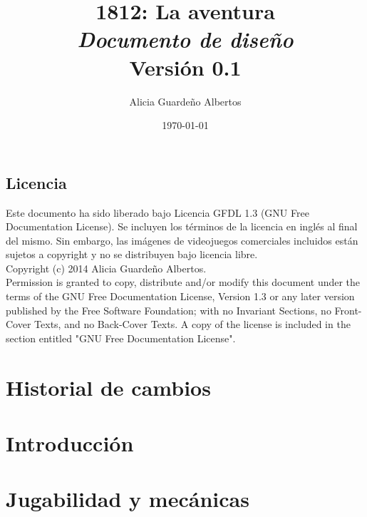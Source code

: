 \documentclass[a4paper,11pt,titlepage]{book}
\title{{\Huge \bf 1812: La aventura}\\{\large \em Documento de diseño}\\{\normalsize Versión 0.1}}
\author{Alicia Guardeño Albertos}
\date{\today}
\begin{document}
\renewcommand{\figurename}{Figura}
\renewcommand{\listfigurename}{Indice de figuras}
\renewcommand{\tablename}{Tabla}
\renewcommand{\listtablename}{Indice de tablas}

\vfill
\maketitle
\vfill
    \tableofcontents
    \listoffigures

\setlength{\parskip}{\baselineskip} %

\newpage
\section*{Licencia} %

Este documento ha sido liberado bajo Licencia GFDL 1.3 (GNU Free
Documentation License). Se incluyen los términos de la licencia en
inglés al final del mismo. Sin embargo, las imágenes de videojuegos comerciales incluidos están sujetos a copyright y no se distribuyen bajo licencia libre.\\

Copyright (c) 2014 Alicia Guardeño Albertos.\\

Permission is granted to copy, distribute and/or modify this document under the
terms of the GNU Free Documentation License, Version 1.3 or any later version
published by the Free Software Foundation; with no Invariant Sections, no
Front-Cover Texts, and no Back-Cover Texts. A copy of the license is included in
the section entitled "GNU Free Documentation License".\\

\newpage
\chapter{Historial de cambios}
\label{chap:historial}


\chapter{Introducción}%
\label{chap:introduccion}


\chapter{Jugabilidad y mecánicas}
\label{chap:jugabilidad}

\end{document}
